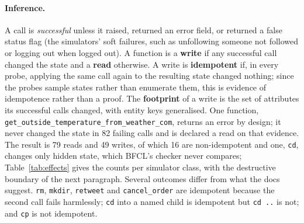 \documentclass{article}
\newcommand{\cls}[1]{\texttt{#1}}
\begin{document}
\paragraph{Inference.} A call is \emph{successful} unless it raised, returned an error field, or returned a false status
flag (the simulators' soft failures, such as unfollowing someone not followed or logging out when logged out). A function
is a \textbf{write} if any successful call changed the state and a \textbf{read} otherwise. A write is
\textbf{idempotent} if, in every probe, applying the same call again to the resulting state changed nothing; since the
probes sample states rather than enumerate them, this is evidence of idempotence rather than a proof. The
\textbf{footprint} of a write is the set of attributes its successful calls changed, with entity keys generalised. One
function, \cls{get\_outside\_temperature\_from\_weather\_com}, returns an error by design; it never changed the state in
82 failing calls and is declared a read on that evidence. The result is 79 reads and 49 writes, of which 16 are non-idempotent and one, \cls{cd}, changes only hidden state, which
BFCL's checker never compares; Table~\ref{tab:effects} gives the counts per simulator class, with the destructive
boundary of the next paragraph. Several outcomes differ from what
the docs suggest. \cls{rm}, \cls{mkdir}, \cls{retweet} and \cls{cancel\_order} are idempotent because the second call
fails harmlessly; \cls{cd} into a named child is idempotent but \cls{cd ..} is not; and \cls{cp} is not idempotent.
\end{document}
